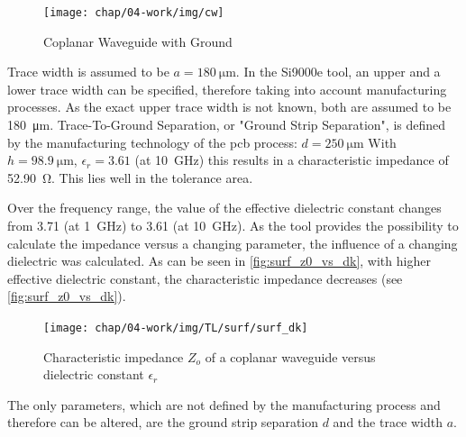 \begin{figure}[!htbp]
	\centering
	\texttt{[image: chap/04-work/img/cw]}
	\caption{Coplanar Waveguide with Ground}
	\label{fig:microstrip_geometry}
\end{figure}

Trace width is assumed to be $a = \SI{180}{\micro\meter}$.
In the Si9000e tool, an upper and a lower trace width can be specified, therefore taking into account manufacturing processes.
As the exact upper trace width is not known, both are assumed to be \SI{180}{\micro\meter}.
Trace-To-Ground Separation, or "Ground Strip Separation", is defined by the manufacturing technology of the \gls{pcb} process: $d = \SI{250}{\micro\meter}$
With $h = \SI{98.9}{\micro \meter}$, $\epsilon_r = 3.61$ (at \SI{10}{\GHz}) this results in a characteristic impedance of \SI{52.90}{\ohm}. This lies well in the tolerance area. %

Over the frequency range, the value of the effective dielectric constant changes from 3.71 (at \SI{1}{\GHz}) to 3.61 (at \SI{10}{\GHz}).
As the tool provides the possibility to calculate the impedance versus a changing parameter, the influence of a changing dielectric was calculated. %
As can be seen in \autoref{fig:surf_z0_vs_dk}, with higher effective dielectric constant, the characteristic impedance decreases (see \autoref{fig:surf_z0_vs_dk}).

\begin{figure}[tbh]
	\centering
	\texttt{[image: chap/04-work/img/TL/surf/surf\_dk]}
	\caption[Coplanar waveguide, $Z_o$ vs $\epsilon_r$]{Characteristic impedance $Z_o$ of a coplanar waveguide versus dielectric constant $\epsilon_r$}
	\label{fig:cwv_d1}
\end{figure}


The only parameters, which are not defined by the manufacturing process and therefore can be altered, are the ground strip separation $d$ and the trace width $a$.


